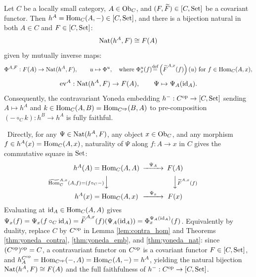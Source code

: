 \documentclass[10pt,a4paper]{article}
\begin{document}
\begin{theorem}\label{thm:yoneda_cov}
Let $C$ be a locally small category, $A \in {\textrm{Ob}}_C$, and $(F, {\widetilde{F}\textrm{}}) \in [C, {\textrm{Set}}]$ be a covariant functor. Then $h^A = {\textrm{Hom}}_C(A, -) \in [C, {\textrm{Set}}]$, and there is a bijection natural in both $A \in C$ and $F \in [C, {\textrm{Set}}]$:
$${\textrm{Nat}}(h^A, F) \cong F(A)$$
given by mutually inverse maps:
$$\Phi^{A,F} : F(A) \to {\textrm{Nat}}(h^A, F), \qquad u \mapsto \Phi^u, \quad \textrm{where } \Phi^u_x(f) {\stackrel{{\textrm{def}}}{=}} \left({\widetilde{F}\textrm{}}^{A,x}(f)\right)(u) \textrm{ for } f \in {\textrm{Hom}}_C(A,x),$$
$$\mathrm{ev}^A : {\textrm{Nat}}(h^A, F) \to F(A), \qquad \Psi \mapsto \Psi_A({\textrm{id}}_A).$$
Consequently, the contravariant Yoneda embedding $h^- : C^{\textrm{op}} \to [C, {\textrm{Set}}]$ sending $A \mapsto h^A$ and $k \in {\textrm{Hom}}_C(A,B) = {\textrm{Hom}}_{C^{\textrm{op}}}(B,A)$ to pre-composition $(- \circ_C k) : h^B \to h^A$ is fully faithful.
\end{theorem}
\myprf\ Directly, for any $\Psi \in {\textrm{Nat}}(h^A, F)$, any object $x \in {\textrm{Ob}}_C$, and any morphism $f \in h^A(x) = {\textrm{Hom}}_C(A,x)$, naturality of $\Psi$ along $f : A \to x$ in $C$ gives the commutative square in ${\textrm{Set}}$:
$$\begin{CD}
h^A(A) = \Hom_C(A,A) @>{\Psi_A}>> F(A) \\
@V{\HomMor_C^{A,x}(A,f) = (f \circ_C -)}VV @VV{\FMor^{A,x}(f)}V \\
h^A(x) = \Hom_C(A,x) @>{\Psi_x}>> F(x)
\end{CD}$$
Evaluating at ${\textrm{id}}_A \in {\textrm{Hom}}_C(A,A)$ gives $\Psi_x(f) = \Psi_x(f \circ_C {\textrm{id}}_A) = {\widetilde{F}\textrm{}}^{A,x}(f)(\Psi_A({\textrm{id}}_A)) = \Phi^{\Psi_A({\textrm{id}}_A)}_x(f)$. Equivalently by duality, replace $C$ by $C^{\textrm{op}}$ in Lemma \ref{lem:contra_hom} and Theorems \ref{thm:yoneda_contra}, \ref{thm:yoneda_emb}, and \ref{thm:yoneda_nat}: since $(C^{\textrm{op}})^{\textrm{op}} = C$, a contravariant functor on $C^{\textrm{op}}$ is a covariant functor $F \in [C, {\textrm{Set}}]$, and $h_A^{C^{\textrm{op}}} = {\textrm{Hom}}_{C^{\textrm{op}}}(-, A) = {\textrm{Hom}}_C(A, -) = h^A$, yielding the natural bijection ${\textrm{Nat}}(h^A, F) \cong F(A)$ and the full faithfulness of $h^- : C^{\textrm{op}} \to [C, {\textrm{Set}}]$. \myqed
\end{document}
